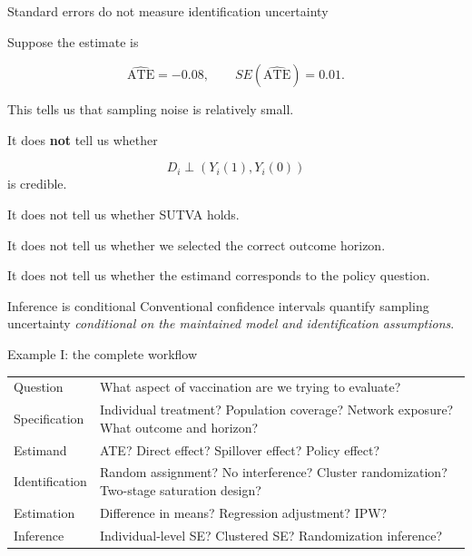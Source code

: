 \documentclass[aspectratio=169,11pt]{beamer}
\newcommand{\ATE}{\mathrm{ATE}}
\begin{document}
\begin{frame}{Standard errors do not measure identification uncertainty}

Suppose the estimate is

\[
\widehat{\ATE}=-0.08,
\qquad
SE(\widehat{\ATE})=0.01.
\]

This tells us that sampling noise is relatively small.

It does \textbf{not} tell us whether

\[
D_i\perp(Y_i(1),Y_i(0))
\]
is credible.

It does not tell us whether SUTVA holds.

It does not tell us whether we selected the correct outcome horizon.

It does not tell us whether the estimand corresponds to the policy question.

\vspace{0.35em}

\begin{block}{Inference is conditional}
Conventional confidence intervals quantify sampling uncertainty
\emph{conditional on the maintained model and identification assumptions}.
\end{block}

\end{frame}

\begin{frame}{Example I: the complete workflow}

\small

\begin{tabular}{B{0.22\textwidth} L{0.68\textwidth}}
\toprule
Question
&
What aspect of vaccination are we trying to evaluate?
\\[0.5em]

Specification
&
Individual treatment?
Population coverage?
Network exposure?
What outcome and horizon?
\\[0.5em]

Estimand
&
ATE?
Direct effect?
Spillover effect?
Policy effect?
\\[0.5em]

Identification
&
Random assignment?
No interference?
Cluster randomization?
Two-stage saturation design?
\\[0.5em]

Estimation
&
Difference in means?
Regression adjustment?
IPW?
\\[0.5em]

Inference
&
Individual-level SE?
Clustered SE?
Randomization inference?
\\
\bottomrule
\end{tabular}

\vspace{0.4em}

\begin{center}
\Large
{}
\end{center}

\end{frame}
\end{document}
